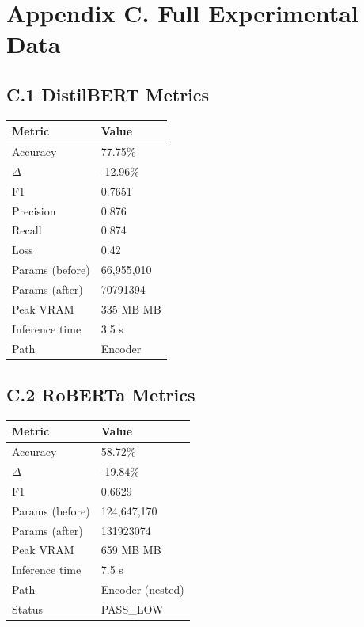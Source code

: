 
\section{Appendix C. Full Experimental Data}

\subsection{C.1 DistilBERT Metrics}

\begin{table}[H]
\centering
\small
\begin{tabular}{ll}
\toprule
\textbf{Metric} & \textbf{Value} \\
\midrule
Accuracy & 77.75\% \\
$\Delta$ & -12.96\% \\
F1 & 0.7651 \\
Precision & 0.876 \\
Recall & 0.874 \\
Loss & 0.42 \\
Params (before) & 66,955,010 \\
Params (after) & 70791394 \\
Peak VRAM & 335 MB MB \\
Inference time & 3.5 s \\
Path & Encoder \\
\bottomrule
\end{tabular}
\end{table}

\subsection{C.2 RoBERTa Metrics}

\begin{table}[H]
\centering
\small
\begin{tabular}{ll}
\toprule
\textbf{Metric} & \textbf{Value} \\
\midrule
Accuracy & 58.72\% \\
$\Delta$ & -19.84\% \\
F1 & 0.6629 \\
Params (before) & 124,647,170 \\
Params (after) & 131923074 \\
Peak VRAM & 659 MB MB \\
Inference time & 7.5 s \\
Path & Encoder (nested) \\
Status & PASS_LOW \\
\bottomrule
\end{tabular}
\end{table}

